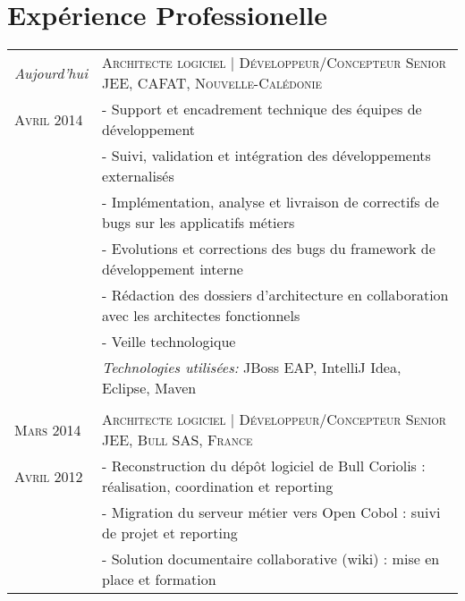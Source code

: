 \newcommand{\el}{\quad - \enspace}

\section{\texorpdfstring{\color{Blue}Expérience Professionelle}{Expérience Professionelle}}
\begin{longtable}{R{2.5cm}|p{14.8cm}}
  \emph{Aujourd'hui}      & \textsc{Architecte logiciel | Développeur/Concepteur Senior JEE, CAFAT, Nouvelle-Calédonie}   \\
  \textsc{Avril 2014}     & \el Support et encadrement technique des équipes de développement                             \\
                          & \el Suivi, validation et intégration des développements externalisés                          \\
                          & \el Implémentation, analyse et livraison de correctifs de bugs sur les applicatifs métiers    \\
                          & \el Evolutions et corrections des bugs du framework de développement interne                  \\
                          & \el Rédaction des dossiers d'architecture en collaboration avec les architectes fonctionnels  \\
                          & \el Veille technologique                                                                      \\
                          & \footnotesize{\emph{Technologies utilisées:} JBoss EAP, IntelliJ Idea, Eclipse, Maven }       \\
                                                                                                      \\
  \textsc{Mars 2014}      & \textsc{Architecte logiciel | Développeur/Concepteur Senior JEE, Bull SAS, France}            \\
  \textsc{Avril 2012}     & \el Reconstruction du dépôt logiciel de Bull Coriolis : réalisation, coordination et reporting\\
                          & \el Migration du serveur métier vers Open Cobol : suivi de projet et reporting                \\
                          & \el Solution documentaire collaborative (wiki) : mise en place et formation                   \\

\end{longtable}
